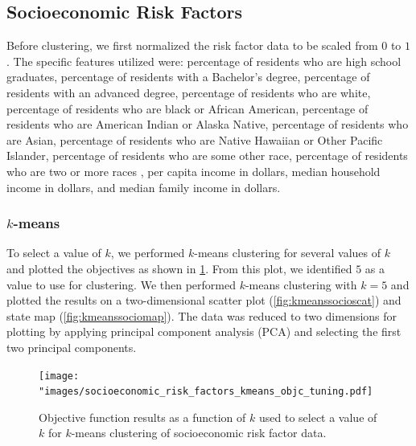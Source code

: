 \documentclass{article}
\begin{document}
\subsection{Socioeconomic Risk Factors}
Before clustering, we first normalized the risk factor data to be scaled from $0$ to $1$. The specific features utilized were: percentage of residents who are high school graduates, percentage of residents with a Bachelor's degree, percentage of residents with an advanced degree, percentage of residents who are white, percentage of residents who are black or African American, percentage of residents who are American Indian or Alaska Native, percentage of residents who are Asian, percentage of residents who are Native Hawaiian or Other Pacific Islander, percentage of residents who are some other race, percentage of residents who are two or more races	, per capita income in dollars, median household income in dollars, and median family income in dollars.

\subsubsection{$k$-means}
To select a value of $k$, we performed $k$-means clustering for several values of $k$ and plotted the objectives as shown in \cref{fig:kmeanssocioselect}. From this plot, we identified $5$ as a value to use for clustering. We then performed $k$-means clustering with $k=5$ and plotted the results on a two-dimensional scatter plot (\cref{fig:kmeanssocioscat}) and state map (\cref{fig:kmeanssociomap}). The data was reduced to two dimensions for plotting by applying principal component analysis (PCA) and selecting the first two principal components.

\begin{figure}[h]
\centering
\caption{Objective function results as a function of $k$ used to select a value of $k$ for $k$-means clustering of socioeconomic risk factor data.}
\texttt{[image: "images/socioeconomic\_risk\_factors\_kmeans\_objc\_tuning.pdf]}
\label{fig:kmeanssocioselect}
\end{figure}
\end{document}
